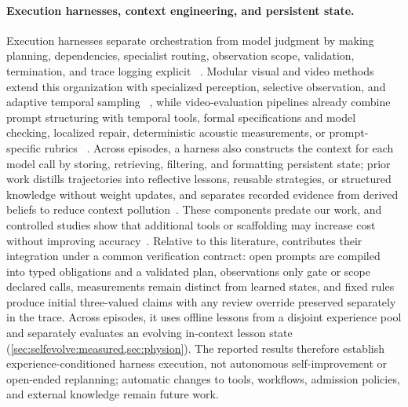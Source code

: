 \paragraph{Execution harnesses, context engineering, and persistent state.}
Execution harnesses separate orchestration from model judgment by making
planning, dependencies, specialist routing, observation scope, validation,
termination, and trace logging explicit
~\cite{toolformer2023,gpt4tools2023,hugginggpt2023,rewoo2023,llmcompiler2024}.
Modular visual and video methods extend this organization with specialized
perception, selective observation, and adaptive temporal sampling
~\cite{visprog2023,vipergpt2023,codevqa2023,proviq2023,morevqa2024,
videoagent_wang2024,videoagent_fan2024,videotree2025,caviar2025,lenswalk2026},
while video-evaluation pipelines already combine prompt structuring with
temporal tools, formal specifications and model checking, localized repair,
deterministic acoustic measurements, or prompt-specific rubrics
~\cite{videogeneval2025,neusv2025,neuse2025,cui2026avphys}. Across episodes, a
harness also constructs the context for each model call by storing, retrieving,
filtering, and formatting persistent state; prior work distills trajectories
into reflective lessons, reusable strategies, or structured knowledge without
weight updates, and separates recorded evidence from derived beliefs to reduce
context pollution~\cite{explicitmem2026,contexttraining2026,reasoningbank2026,
reflexion2023,plugmem2026,hindsight2026}. These components predate our work, and
controlled studies show that additional tools or scaffolding may increase cost
without improving accuracy~\cite{findeis2025external,kapoor2026hal}. Relative
to this literature, \PhyReAct{} contributes their integration under a common
verification contract: open prompts are compiled into typed obligations and a
validated plan, observations only gate or scope declared calls, measurements
remain distinct from learned states, and fixed rules produce initial
three-valued claims with any review override preserved separately in the trace.
Across episodes, it uses offline lessons from a disjoint experience pool and
separately evaluates an evolving in-context lesson state
(\cref{sec:selfevolve:measured,sec:physion}). The reported results therefore
establish experience-conditioned harness execution, not autonomous
self-improvement or open-ended replanning; automatic changes to tools,
workflows, admission policies, and external knowledge remain future work.
